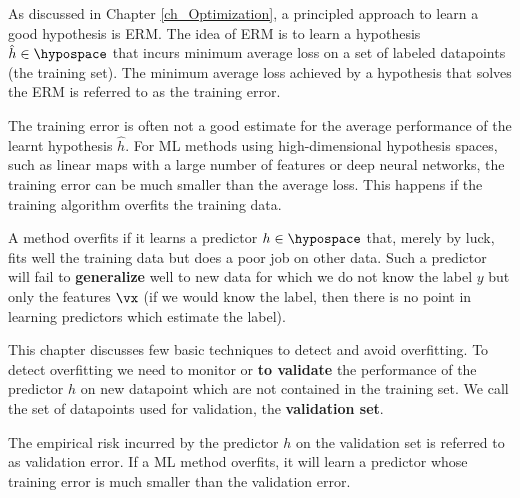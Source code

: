 \documentclass[12pt]{report}
\begin{document}
As discussed in Chapter \ref{ch_Optimization}, a principled approach to learn a 
good hypothesis is ERM. The idea of ERM is to learn a hypothesis $\hat{h} \in \hypospace$ that incurs 
minimum average loss on a set of labeled datapoints (the training set). The minimum 
average loss achieved by a hypothesis that solves the ERM is referred to as the training error. 

The training error is often not a good estimate for the average performance 
of the learnt hypothesis $\hat{h}$. For ML methods using high-dimensional 
hypothesis spaces, such as linear maps with a large number of features or 
deep neural networks, the training error can be much smaller than the 
average loss. This happens if the training algorithm overfits the training data. 

A method overfits if it learns a predictor $h \in \hypospace$ that, 
merely by luck, fits well the training data but does a poor job on 
other data. Such a predictor will fail to {\bf generalize} well to new 
data for which we do not know the label $y$ but only the features 
$\vx$ (if we would know the label, then there is no point in learning 
predictors which estimate the label). 

This chapter discusses few basic techniques to detect and avoid overfitting. 
To detect overfitting we need to monitor or {\bf to validate} the performance of 
the predictor $h$ on new datapoint which are not contained in the training set. 
We call the set of datapoints used for validation, the {\bf validation set}. 

The empirical risk incurred by the predictor $h$ on the validation set is referred 
to as validation error. If a ML method overfits, it will learn a predictor whose training 
error is much smaller than the validation error. 
%
%
\end{document}
